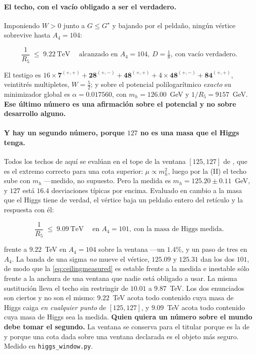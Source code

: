 \documentclass[11pt,a4paper]{article}
\newcommand{\rep}[1]{\mathbf{#1}}
\newenvironment{keyeq}
  {\begin{center}\setlength{\fboxsep}{9pt}\setlength{\fboxrule}{0.8pt}%
   \begin{lrbox}{\keyeqbox}\begin{minipage}{0.88\textwidth}}
  {\end{minipage}\end{lrbox}%
   \fcolorbox{hdrblue!55}{hdrblue!6}{\usebox{\keyeqbox}}\end{center}}
\begin{document}
\paragraph{El techo, con el vacío obligado a ser el verdadero.} Imponiendo $W>0$ junto a
$G\le G^\star$ y bajando por el peldaño, ningún vértice sobrevive hasta $A_4=104$:
\begin{keyeq}
\begin{equation}\label{eq:ceilingtrue}
  \boxed{\;\frac{1}{R_5}\;\le\;9.22\ \text{TeV}\;}
  \quad\text{alcanzado en } A_4=104,\ D=\tfrac18,\ \text{con vacío verdadero.}
\end{equation}
\end{keyeq}
\noindent El testigo es
$16\times\rep7^{(+,+)}+\rep{28}^{(+,-)}+\rep{48}^{(+,+)}+4\times\rep{48}^{(+,-)}+\rep{84}^{(+,+)}$,
veintitrés multipletes, $W=\tfrac52$; y sobre el potencial polilogarítmico \emph{exacto} su minimizador
global es $\alpha=0.017560$, con $m_h=126.00$~GeV y $1/R_5=9157$~GeV. \textbf{Ese último número es
una afirmación sobre el potencial y no sobre desarrollo alguno.}

\paragraph{Y hay un segundo número, porque $127$ no es una masa que el Higgs tenga.} Todos los
techos de aquí se evalúan en el tope de la ventana $[125,127]$ de \cite{KM25}, que es el extremo
correcto para una cota superior: $\mu\propto m_h^2$, luego por la (II) el techo sube con $m_h$
---medido, no supuesto. Pero la medida es $m_h=125.20\pm0.11$~GeV, y $127$ está $16.4$ desviaciones
típicas por encima. Evaluado en cambio a la masa que el Higgs tiene de verdad, el vértice baja un
peldaño entero del retículo y la respuesta con él:
\begin{keyeq}
\begin{equation}\label{eq:ceilingmeasured}
  \boxed{\;\frac{1}{R_5}\;\le\;9.09\ \text{TeV}\;}
  \quad\text{en } A_4=101,\ \text{con la masa de Higgs medida.}
\end{equation}
\end{keyeq}
frente a $9.22$~TeV en $A_4=104$ sobre la ventana ---un $1.4\%$, y un paso de tres en $A_4$. La
banda de una sigma \emph{no} mueve el vértice, $125.09$ y $125.31$ dan los dos $101$, de modo que la
\eqref{eq:ceilingmeasured} es estable frente a la medida e inestable sólo frente a la anchura de una
ventana que nadie está obligado a usar. La misma sustitución lleva el techo sin restringir de
$10.01$ a $9.87$~TeV. Los dos enunciados son ciertos y no son el mismo: $9.22$~TeV acota todo
contenido cuya masa de Higgs caiga \emph{en cualquier punto} de $[125,127]$, y $9.09$~TeV acota todo
contenido cuya masa de Higgs sea la medida. \textbf{Quien quiera un número sobre el mundo debe tomar
el segundo.} La ventana se conserva para el titular porque es la de \cite{KM25} y porque una cota
dada sobre una ventana declarada es el objeto más seguro. Medido en
\texttt{higgs\_\allowbreak window.py}.
\end{document}

